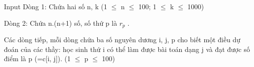 Input
Dòng 1: Chứa hai số n, k (1  $\le$  n  $\le$  100; 1  $\le$  k  $\le$  1000)

Dòng 2: Chứa n.(n+1) số, số thứ p là $r_{p}$ .

Các dòng tiếp, mỗi dòng chứa ba số nguyên dương i, j, p cho biết một điều dự đoán của các thầy: học sinh thứ i có thể làm được bài toán dạng j và đạt được số điểm là p (=c[i, j]). (1  $\le$  p  $\le$  100)